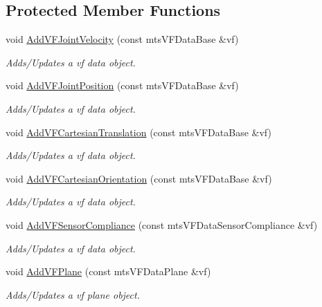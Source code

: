 \subsection*{Protected Member Functions}
\begin{DoxyCompactItemize}
\item 
void \hyperlink{classmts_v_f_controller_ae70b46834ff034559ce9b3686e5491d5}{Add\+V\+F\+Joint\+Velocity} (const mts\+V\+F\+Data\+Base \&vf)
\begin{DoxyCompactList}\small\item\em Adds/\+Updates a vf data object. \end{DoxyCompactList}\item 
void \hyperlink{classmts_v_f_controller_a4602b21dbc406f5da5d57ccad53f3528}{Add\+V\+F\+Joint\+Position} (const mts\+V\+F\+Data\+Base \&vf)
\begin{DoxyCompactList}\small\item\em Adds/\+Updates a vf data object. \end{DoxyCompactList}\item 
void \hyperlink{classmts_v_f_controller_a4f8136fca2b4840412a52ef9a679500b}{Add\+V\+F\+Cartesian\+Translation} (const mts\+V\+F\+Data\+Base \&vf)
\begin{DoxyCompactList}\small\item\em Adds/\+Updates a vf data object. \end{DoxyCompactList}\item 
void \hyperlink{classmts_v_f_controller_ac02fa25858e0e7305f07663a69636fe9}{Add\+V\+F\+Cartesian\+Orientation} (const mts\+V\+F\+Data\+Base \&vf)
\begin{DoxyCompactList}\small\item\em Adds/\+Updates a vf data object. \end{DoxyCompactList}\item 
void \hyperlink{classmts_v_f_controller_a7d4ca819b6e68d9b33b5ef02172fffff}{Add\+V\+F\+Sensor\+Compliance} (const mts\+V\+F\+Data\+Sensor\+Compliance \&vf)
\begin{DoxyCompactList}\small\item\em Adds/\+Updates a vf data object. \end{DoxyCompactList}\item 
void \hyperlink{classmts_v_f_controller_afa5a3424cc0d16e49728edd375aaedc4}{Add\+V\+F\+Plane} (const mts\+V\+F\+Data\+Plane \&vf)
\begin{DoxyCompactList}\small\item\em Adds/\+Updates a vf plane object. \end{DoxyCompactList}\item 

\end{DoxyCompactItemize}
